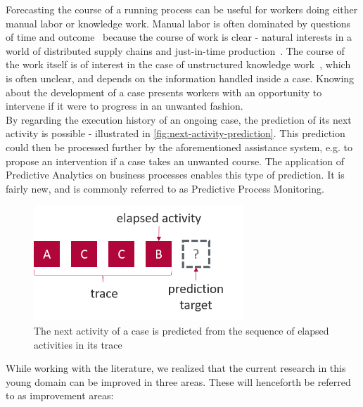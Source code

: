 Forecasting the course of a running process can be useful for workers doing either manual labor or knowledge work. Manual labor is often dominated by questions of time and outcome~\cite{rogge2013} because the course of work is clear - natural interests in a world of distributed supply chains and just-in-time production~\cite{web:economist:jit}. The course of the work itself is of interest in the case of unstructured knowledge work~\cite{francescomarino2015}, which is  often unclear, and depends on the information handled inside a case. Knowing about the development of a case presents workers with an opportunity to intervene if it were to progress in an unwanted fashion.\\

By regarding the execution history of an ongoing case, the prediction of its next activity is possible - illustrated in \autoref{fig:next-activity-prediction}. This prediction could then be processed further by the aforementioned assistance system, e.g. to propose an intervention if a case takes an unwanted course. The application of Predictive Analytics on business processes enables this type of prediction. It is fairly new, and is commonly referred to as Predictive Process Monitoring.

\begin{figure}
    \centering
    \includegraphics[width=0.7\textwidth]{gfx/next-activity.png}
    \caption[Next-activity prediction from a trace]{The next activity of a case is predicted from the sequence of elapsed activities in its trace}
    \label{fig:next-activity-prediction}
\end{figure}

While working with the literature, we realized that the current research in this young domain can be improved in three areas. These will henceforth be referred to as improvement areas:

